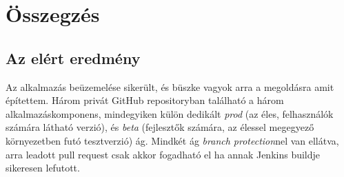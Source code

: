 \chapter{Összegzés}
\section{Az elért eredmény}
Az alkalmazás beüzemelése sikerült, és büszke vagyok arra a megoldásra amit építettem. Három privát GitHub repositoryban található a három alkalmazáskomponens, mindegyiken külön dedikált \textit{prod} (az éles, felhasználók számára látható verzió), és \textit{beta} (fejlesztők számára, az élessel megegyező környezetben futó tesztverzió) ág. Mindkét ág \textit{branch protection}nel van ellátva, arra leadott pull request csak akkor fogadható el ha annak Jenkins buildje sikeresen lefutott.

